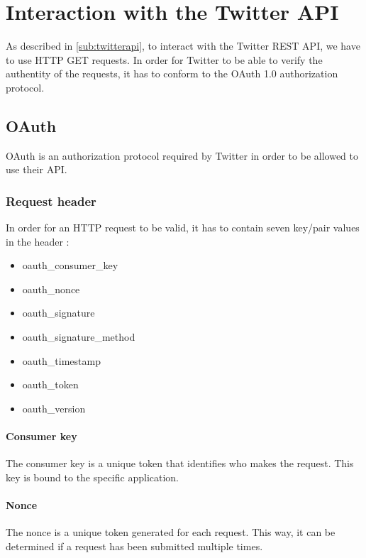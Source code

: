\chapter{Interaction with the Twitter \ac{API}}
As described in \autoref{sub:twitterapi}, to interact with the Twitter
\ac{REST} \ac{API}, we have to use \ac{HTTP} GET requests. In order for
Twitter to be able to verify the authentity of the requests, it has to conform
to the OAuth 1.0 authorization protocol.
\section{OAuth}
OAuth is an authorization protocol required by Twitter in order to be allowed to
use their \ac{API}.

\subsection{Request header}
In order for an \ac{HTTP} request to be valid, it has to
contain seven key/pair values in the header \citep{TwitterAPIAuth}:
\begin{itemize}
  \item oauth\_consumer\_key
  \item oauth\_nonce
  \item oauth\_signature
  \item oauth\_signature\_method
  \item oauth\_timestamp
  \item oauth\_token
  \item oauth\_version
\end{itemize}

\subsubsection*{Consumer key}
The consumer key is a unique token that identifies who makes the request.
This key is bound to the specific application.

\subsubsection*{Nonce}
The nonce is a unique token generated for each request. This way, it can be
determined if a request has been submitted multiple times. 

